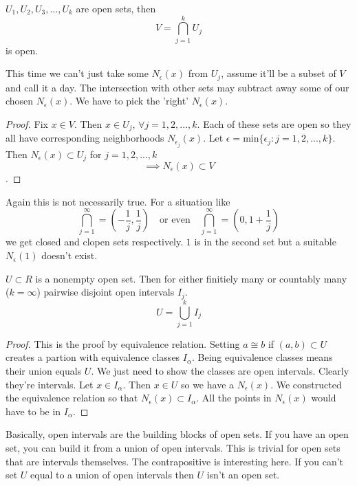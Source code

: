 \documentclass{article}
\begin{document}
\begin{theorem}
    \( U_1, U_2, U_3, ..., U_k \) are open sets, then 
    \[
        V = \bigcap_{j=1}^k U_j
    \] 
    is open.
\end{theorem}

This time we can't just take some \( N_\epsilon(x) \) from \( U_j \), assume it'll be a subset of
\( V \) and call it a day. The intersection with other sets may subtract away some of our 
chosen  \( N_\epsilon(x) \). We have to pick the 'right' \( N_\epsilon(x) \).
\begin{proof}
    Fix \( x \in V \). Then \( x \in U_j\), \( \forall j = 1, 2, ..., k \).
    Each of these sets are open so they all have corresponding 
    neighborhoods \( N_{\epsilon_j}(x) \). Let \( \epsilon = \text{min}\{ \epsilon_j : j = 1, 2, ..., k \} \). \\
    Then  \( N_\epsilon(x) \subset U_j\) for \( j = 1, 2, ..., k \)  
    \[ \implies N_\epsilon(x) \subset V  \].
\end{proof}

Again this is not necessarily true. For a situation like 
\[
    \bigcap_{j=1}^\infty = (- \frac{1}{j}, \frac{1}{j}) \quad \text{or even} \quad
    \bigcap_{j=1}^\infty = (0, 1 + \frac{1}{j})
\] 
we get closed and clopen sets respectively. \( 1 \) is in the second set but a
suitable \( N_\epsilon(1) \) doesn't exist.

\begin{theorem}
    \( U \subset R \) is a nonempty open set. Then
    for either finitiely many or countably many (\( k = \infty \)) pairwise disjoint
    open intervals \( I_j \).
    \[
        U = \bigcup_{j=1}^k I_j 
    \] 
\end{theorem}
\begin{proof}
    This is the proof by equivalence relation. Setting \( a \cong b \) if \( (a,b) \subset U \)
    creates a partion with equivalence classes \( I_\alpha \). Being equivalence classes 
    means their union equals \( U \). We just need to show the classes are open intervals.
    Clearly they're intervals. Let \( x \in I_\alpha \). Then  \( x \in U \) so we have a
    \( N_\epsilon(x) \). We constructed the equivalence relation so that 
    \( N_\epsilon(x) \subset I_\alpha \). All the points in \( N_\epsilon(x) \) would
    have to be in \( I_\alpha \).
\end{proof}

Basically, open intervals are the building blocks of open sets. If you have an open set, you
can build it from a union of open intervals. This is trivial for open sets that are 
intervals themselves. 
\smallbreak
The contrapositive is interesting here. If you can't set \( U \) equal to a union of open 
intervals then \( U \) isn't an open set.
\end{document}
